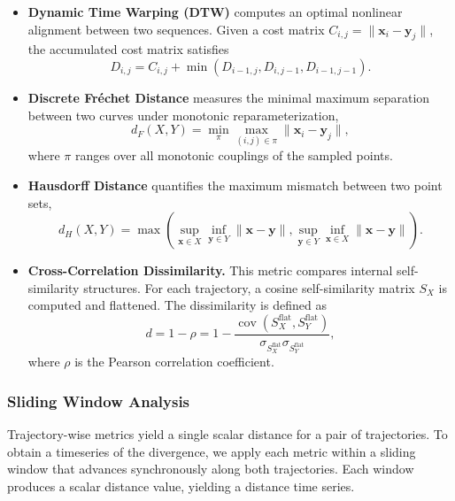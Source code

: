 \documentclass[aip%
 aip,
 amsmath,amssymb,
 reprint,%
]{revtex4-1}
\begin{document}
\begin{itemize}
\item \textbf{Dynamic Time Warping (DTW)} \cite{SalvadorChan2007} computes an optimal nonlinear alignment between two sequences. Given a cost matrix $C_{i,j}=\|\mathbf{x}_i-\mathbf{y}_j\|$, the accumulated cost matrix satisfies
\begin{equation}
D_{i,j} = C_{i,j} + \min(D_{i-1,j},D_{i,j-1},D_{i-1,j-1}).
\end{equation}

\item \textbf{Discrete Fréchet Distance} \cite{Denaxas2023,EiterMannila1994} measures the minimal maximum separation between two curves under monotonic reparameterization,
\begin{equation}
d_F(X,Y) = \min_{\pi} \max_{(i,j)\in\pi} \|\mathbf{x}_i-\mathbf{y}_j\|,
\end{equation}
where $\pi$ ranges over all monotonic couplings of the sampled points.

\item \textbf{Hausdorff Distance} \cite{SciPyDirectedHausdorff} quantifies the maximum mismatch between two point sets,
{\small
\begin{equation}
d_H(X,Y) =
\max\!\left(
\sup_{\mathbf{x}\in X}\inf_{\mathbf{y}\in Y}\|\mathbf{x}-\mathbf{y}\|,
\sup_{\mathbf{y}\in Y}\inf_{\mathbf{x}\in X}\|\mathbf{x}-\mathbf{y}\|
\right).
\end{equation}
}


\item \textbf{Cross-Correlation Dissimilarity.}
This metric compares internal self-similarity structures. For each trajectory, a cosine self-similarity matrix $S_X$ is computed and flattened. The dissimilarity is defined as
\begin{equation}
d = 1 - \rho
=
1 - \frac{\operatorname{cov}(S_X^{\mathrm{flat}},S_Y^{\mathrm{flat}})}
{\sigma_{S_X^{\mathrm{flat}}}\sigma_{S_Y^{\mathrm{flat}}}},
\end{equation}
where $\rho$ is the Pearson correlation coefficient.
\end{itemize}

\subsubsection{Sliding Window Analysis}
\label{sssec:methods_sliding_window}

Trajectory-wise metrics yield a single scalar distance for a pair of trajectories. To obtain a timeseries of the divergence, we apply each metric within a sliding window that advances synchronously along both trajectories. Each window produces a scalar distance value, yielding a distance time series.
\end{document}
